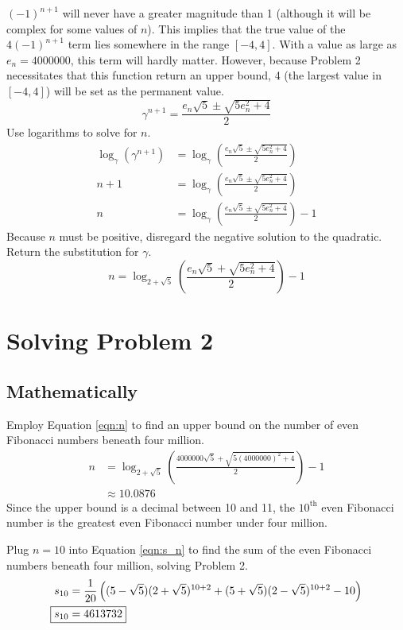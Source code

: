 \documentclass[titlepage]{article}
\begin{document}
$(-1)^{n+1}$ will never have a greater magnitude than 1 (although it will be complex for some values of $n$). This implies that the true value of the $4(-1)^{n+1}$ term lies somewhere in the range $[-4,4]$. With a value as large as $e_n=4000000$, this term will hardly matter. However, because Problem 2 necessitates that this function return an upper bound, 4 (the largest value in $[-4,4]$) will be set as the permanent value.
\begin{equation*}
    \gamma^{n+1} = \frac{e_n\sqrt{5}\pm\sqrt{5e_n^2+4}}{2}
\end{equation*}
Use logarithms to solve for $n$.
\begin{align*}
    \log_\gamma\left( \gamma^{n+1} \right) &= \log_\gamma\left( \frac{e_n\sqrt{5}\pm\sqrt{5e_n^2+4}}{2} \right)\\
    n+1 &= \log_\gamma\left( \frac{e_n\sqrt{5}\pm\sqrt{5e_n^2+4}}{2} \right)\\
    n &= \log_\gamma\left( \frac{e_n\sqrt{5}\pm\sqrt{5e_n^2+4}}{2} \right)-1
\end{align*}
Because $n$ must be positive, disregard the negative solution to the quadratic. Return the substitution for $\gamma$.
\begin{equation}\label{eqn:n}
    n = \log_{2+\sqrt{5}}\left( \frac{e_n\sqrt{5}+\sqrt{5e_n^2+4}}{2} \right)-1
\end{equation}
\newpage



\section{Solving Problem 2}
\subsection{Mathematically}
Employ Equation \ref{eqn:n} to find an upper bound on the number of even Fibonacci numbers beneath four million.
\begin{align*}
    n &= \log_{2+\sqrt{5}}\left( \frac{4000000\sqrt{5}+\sqrt{5(4000000)^2+4}}{2} \right)-1\\
    &\approx 10.0876
\end{align*}
Since the upper bound is a decimal between 10 and 11, the $10^\text{th}$ even Fibonacci number is the greatest even Fibonacci number under four million.\par
Plug $n=10$ into Equation \ref{eqn:s_n} to find the sum of the even Fibonacci numbers beneath four million, solving Problem 2.
\begin{align*}
    s_{10} &= \frac{1}{20}\left( (5-\sqrt{5})(2+\sqrt{5})^{10+2}+(5+\sqrt{5})(2-\sqrt{5})^{10+2}-10 \right)\\
    \Aboxed{s_{10} &= 4613732}
\end{align*}
\end{document}
